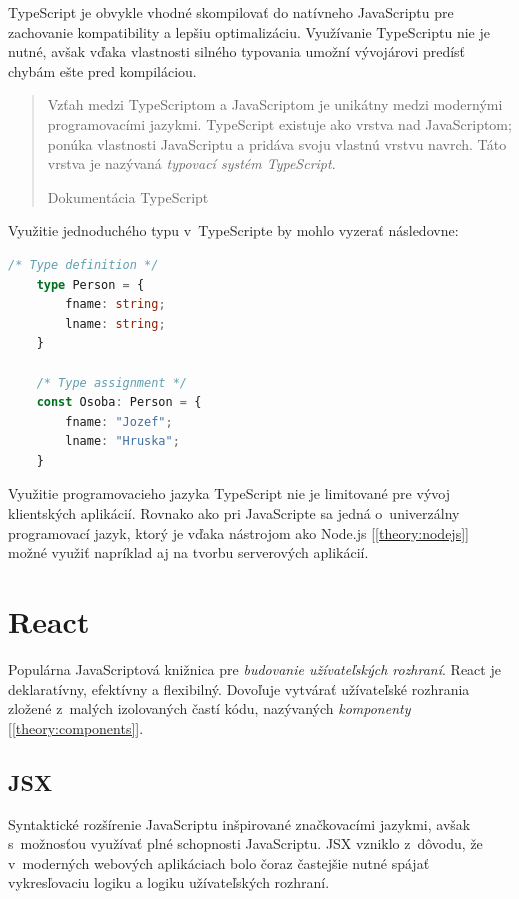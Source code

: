 TypeScript je obvykle vhodné skompilovať do natívneho JavaScriptu pre zachovanie kompatibility a lepšiu optimalizáciu. Využívanie TypeScriptu nie je nutné, avšak vďaka vlastnosti silného typovania umožní vývojárovi predísť chybám ešte pred kompiláciou.

\blockquote[Dokumentácia TypeScript \cite{TSWeb}]{Vzťah medzi TypeScriptom a JavaScriptom je unikátny medzi modernými programovacími jazykmi. TypeScript existuje ako vrstva nad JavaScriptom; ponúka vlastnosti JavaScriptu a pridáva svoju vlastnú vrstvu navrch. Táto vrstva je nazývaná \emph{typovací systém TypeScript}.}

\noindent Využitie jednoduchého typu v~TypeScripte by mohlo vyzerať následovne: \\

\begin{lstlisting}[language=TypeScript, caption=Príklad zápisu v~programovacom jazyku TypeScript.]
	/* Type definition */
	type Person = {
		fname: string;
		lname: string;
	}

	/* Type assignment */
	const Osoba: Person = {
		fname: "Jozef";
		lname: "Hruska";
	}
\end{lstlisting}

\medskip

\noindent Využitie programovacieho jazyka TypeScript nie je limitované pre vývoj klientských aplikácií. Rovnako ako pri JavaScripte sa jedná o~univerzálny programovací jazyk, ktorý je vďaka nástrojom ako Node.js [\ref{theory:nodejs}] možné využiť napríklad aj na tvorbu serverových aplikácií.

\section{React}
\label{theory:react}
Populárna JavaScriptová knižnica pre \emph{budovanie užívateľských rozhraní}. React je deklaratívny, efektívny a flexibilný. Dovoľuje vytvárať užívateľské rozhrania zložené z~malých izolovaných častí kódu, nazývaných \emph{komponenty} [\ref{theory:components}]. \cite{React}

\subsection{JSX}
Syntaktické rozšírenie JavaScriptu inšpirované značkovacími jazykmi, avšak s~možnosťou využívať plné schopnosti JavaScriptu. JSX vzniklo z~dôvodu, že v~moderných webových aplikáciach bolo čoraz častejšie nutné spájať vykresľovaciu logiku a logiku užívateľských rozhraní. \cite{React} \\

